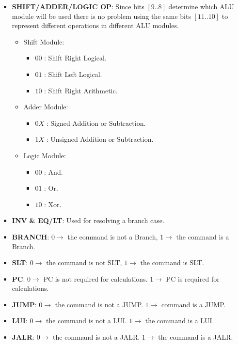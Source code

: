 \begin{itemize}
\begin{itemize}
		\end{itemize}
		\item \textbf{SHIFT/ADDER/LOGIC OP}: Since bits $[9..8]$ determine which ALU module will be used there is no problem using the same bits $[11..10]$ to represent different operations in different ALU modules. 
		\begin{itemize}
			\setlength\itemsep{-0.3em}
			\item Shift Module:
			\begin{itemize}
				\setlength\itemsep{-0.1em}
				\item $00$ : Shift Right Logical.
				\item $01$ : Shift Left Logical.
				\item $10$ : Shift Right Arithmetic.
			\end{itemize}
			\item Adder Module:
			\begin{itemize}
				\setlength\itemsep{-0.1em}				
				\item $0X$ : Signed Addition or Subtraction.
				\item $1X$ : Unsigned Addition or Subtraction.

			\end{itemize}
			\item Logic Module:
			\begin{itemize}
				\setlength\itemsep{-0.1em}
				\item $00$ : And.
				\item $01$ : Or.
				\item $10$ : Xor.			
			\end{itemize}
		\end{itemize}
		
		\item \textbf{INV}\textbf{ \& EQ/LT}: Used for resolving a branch case. 
		\item \textbf{BRANCH}: $0\rightarrow$ the command is not a Branch, $1\rightarrow$ the command is a Branch.
		\item \textbf{SLT}: $0\rightarrow$ the command is not SLT, $1\rightarrow$ the command is SLT.
		\item \textbf{PC}: $0\rightarrow$ PC is not required for calculations. $1\rightarrow$ PC is required for calculations.
		\item \textbf{JUMP}: $0\rightarrow$ the command is not a JUMP. $1\rightarrow$ command is a JUMP.
		\item \textbf{LUI}: $0\rightarrow$ the command is not a LUI. $1\rightarrow$ the command is a LUI.
		\item \textbf{JALR}: $0\rightarrow$ the command is not a JALR. $1\rightarrow$ the command is a JALR.
	\end{itemize}
	
